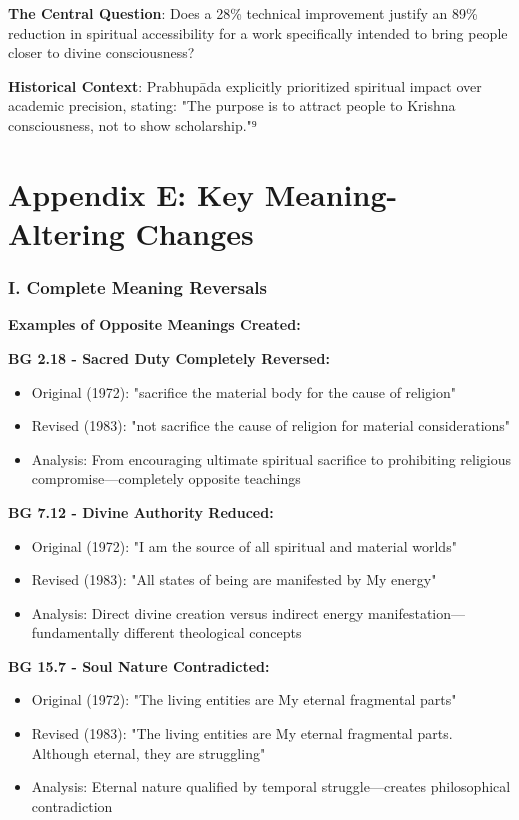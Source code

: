 \documentclass[11pt,twoside]{book}
\begin{document}
\textbf{\textbf{The Central Question}}: Does a 28\% technical improvement justify an 89\% reduction in spiritual accessibility for a work specifically intended to bring people closer to divine consciousness?

\textbf{\textbf{Historical Context}}: Prabhupāda explicitly prioritized spiritual impact over academic precision, stating: "The purpose is to attract people to Krishna consciousness, not to show scholarship."⁹
\part*{Appendix E: Key Meaning-Altering Changes}
\label{sec:org8d130e7}
\thispagestyle{plain}
\section*{I. Complete Meaning Reversals}
\label{sec:org99e38ad}

\textbf{\textbf{Examples of Opposite Meanings Created:}}

\textbf{\textbf{BG 2.18 - Sacred Duty Completely Reversed:}}
\begin{itemize}
\item Original (1972): "sacrifice the material body for the cause of religion"
\item Revised (1983): "not sacrifice the cause of religion for material considerations"
\item Analysis: From encouraging ultimate spiritual sacrifice to prohibiting religious 
compromise—completely opposite teachings
\end{itemize}

\textbf{\textbf{BG 7.12 - Divine Authority Reduced:}}
\begin{itemize}
\item Original (1972): "I am the source of all spiritual and material worlds"
\item Revised (1983): "All states of being are manifested by My energy"
\item Analysis: Direct divine creation versus indirect energy 
manifestation—fundamentally different theological concepts
\end{itemize}

\textbf{\textbf{BG 15.7 - Soul Nature Contradicted:}}
\begin{itemize}
\item Original (1972): "The living entities are My eternal fragmental parts"
\item Revised (1983): "The living entities are My eternal fragmental parts. Although eternal, they are struggling"
\item Analysis: Eternal nature qualified by temporal struggle—creates philosophical 
contradiction
\end{itemize}
\end{document}
